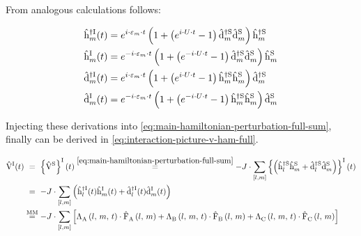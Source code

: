 From analogous calculations follows:

\begin{equation*}
    \begin{split}
        \hopOfT[\interactionPicture]{m}{\dagger}  &= e^{i \cdot \epsl[m]\cdot  t}\left(1 + \left(e^{i  \cdot U  \cdot  t}-1\right) \dop[\schroedingerPicture]{m}{\dagger}\dop[\schroedingerPicture]{m}{}\right)  \hop[\schroedingerPicture]{m}{\dagger}\\
        \hopOfT[\interactionPicture]{m}{}  &= e^{-i \cdot \epsl[m]\cdot  t}\left(1 + \left(e^{-i  \cdot U  \cdot  t}-1\right) \dop[\schroedingerPicture]{m}{\dagger}\dop[\schroedingerPicture]{m}{}\right)  \hop[\schroedingerPicture]{m}{}\\
        \dopOfT[\interactionPicture]{m}{\dagger}  &= e^{i \cdot \epsl[m]\cdot  t}\left(1 + \left(e^{i  \cdot U  \cdot  t}-1\right) \hop[\schroedingerPicture]{m}{\dagger}\hop[\schroedingerPicture]{m}{}\right)  \dop[\schroedingerPicture]{m}{\dagger}\\
        \dopOfT[\interactionPicture]{m}{}  &= e^{-i \cdot \epsl[m]\cdot  t}\left(1 + \left(e^{-i  \cdot U  \cdot  t}-1\right) \hop[\schroedingerPicture]{m}{\dagger}\hop[\schroedingerPicture]{m}{}\right)  \dop[\schroedingerPicture]{m}{}\\
    \end{split}
\end{equation*}

Injecting these derivations into \autoref{eq:main-hamiltonian-perturbation-full-sum}, finally \VhamiltonianOfT[\interactionPicture] can be derived in \autoref{eq:interaction-picture-v-ham-full}.

\begin{equation}
    \label{eq:interaction-picture-v-ham-full}
    \begin{split}
        \VhamiltonianOfT[\interactionPicture] &
        \stackrel{\phantom{\text{MM}}}{=}
        \interactionTimeEvolution{\Vhamiltonian[\schroedingerPicture]} \stackrel{\ref{eq:main-hamiltonian-perturbation-full-sum}}{=}
        - J \cdot \fullneighborsum{l}{m}  \interactionTimeEvolution{
              \left(\hop[\schroedingerPicture]{l}{\dagger}\hop[\schroedingerPicture]{m}{} + \dop[\schroedingerPicture]{l}{\dagger}\dop[\schroedingerPicture]{m}{} \right)
        } \\
        &\stackrel{\phantom{\text{MM}}}{=}
        -J \cdot \fullneighborsum{l}{m}\left(\hopOfT[\interactionPicture]{l}{\dagger}\hopOfT[\interactionPicture]{m}{} + \dopOfT[\interactionPicture]{l}{\dagger}\dopOfT[\interactionPicture]{m}{} \right)\\
        &\stackrel{\text{MM}}{=}
        -J \cdot \fullneighborsum{l}{m} \left[
            \VhamiltonianAnalyticalPart{A}{l}{m}{t} \cdot \VhamiltonianOperatorPart{A}{l}{m} + 
            \VhamiltonianAnalyticalPart{B}{l}{m}{t} \cdot \VhamiltonianOperatorPart{B}{l}{m} + 
            \VhamiltonianAnalyticalPart{C}{l}{m}{t} \cdot \VhamiltonianOperatorPart{C}{l}{m} 
        \right]
    \end{split}
\end{equation}

